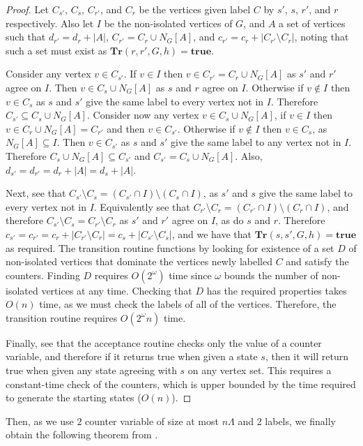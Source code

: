 \documentclass[a4paper,UKenglish,cleveref, autoref, thm-restate]{lipics-v2021} %
\begin{document}
\begin{toappendix}
\begin{proof}
     Let $C_{s'}$, $C_s$, $C_{r'}$, and $C_r$ be the vertices given label $C$ by $s'$, $s$, $r'$, and $r$ respectively. Also let $I$ be the non-isolated vertices of $G$, and $A$ a set of vertices such that $d_{r'}=d_r + |A|$, $C_{r'} = C_r \cup N_G[A]$, and $c_{r'} = c_r + |C_{r'} \setminus C_r|$, noting that such a set must exist as $\mathbf{Tr}(r, r', G,h)=\textbf{true}$.

     Consider any vertex $v \in C_{s'}$. If $v \in I$ then $v \in C_{r'} = C_r \cup N_G[A]$ as $s'$ and $r'$ agree on $I$. Then $v \in C_s \cup N_G[A]$ as $s$ and $r$ agree on $I$. Otherwise if $v \notin I$ then $v \in C_{s}$ as $s$ and $s'$ give the same label to every vertex not in $I$. Therefore $C_{s'} \subseteq C_{s} \cup N_G[A]$. Consider now any vertex $v \in C_{s} \cup N_G[A]$, if $v \in I$ then $v \in C_{r} \cup N_G[A] = C_{r'}$ and then $v \in C_{s'}$. Otherwise if $v \notin I$ then $v \in C_{s}$, as $N_G[A] \subseteq I$. Then $v \in C_{s'}$ as $s$ and $s'$ give the same label to any vertex not in $I$. Therefore $C_{s} \cup N_G[A] \subseteq C_{s'}$ and $C_{s'}=C_{s} \cup N_G[A]$. Also, $d_{s'} = d_{r'} = d_r + |A| = d_s + |A|$. 
    
     Next, see that $C_{s'}\setminus C_s = (C_{s'} \cap I)\setminus (C_s \cap I)$, as $s'$ and $s$ give the same label to every vertex not in $I$. Equivalently see that $C_{r'} \setminus C_r = (C_{r'} \cap I)\setminus (C_r \cap I)$, and therefore $C_{s'} \setminus C_s = C_{r'} \setminus C_r$ as $s'$ and $r'$ agree on $I$, as do $s$ and $r$. Therefore $c_{s'} = c_{r'} = c_{r} + |C_{r'}\setminus C_r|=c_{s} + |C_{s'} \setminus C_s|$, and we have that $\mathbf{Tr}(s, s', G,h)=\textbf{true}$ as required. The transition routine functions by looking for existence of a set $D$ of non-isolated vertices that dominate the vertices newly labelled $C$ and satisfy the counters. Finding $D$ requires $O(2^{\omega})$ time since $\omega$ bounds the number of non-isolated vertices at any time. Checking that $D$ has the required properties takes $O(n)$ time, as we must check the labels of all of the vertices. Therefore, the transition routine requires $O(2^{\omega}n)$ time.

     Finally, see that the acceptance routine checks only the value of a counter variable, and therefore if it returns true when given a state $s$, then it will return true when given any state agreeing with $s$ on any vertex set. This requires a constant-time check of the counters, which is upper bounded by the time required to generate the starting states ($O(n)$).
 \end{proof}
 Then, as we use $2$ counter variable of size at most $n\Lambda$ and 2 labels, we finally obtain the following theorem from . 



\end{toappendix}
\end{document}
